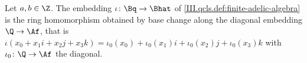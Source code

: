 Let $a,b\in\Z$. The embedding $\iota\colon\Bq\to\Bhat$ of \cref{III.qcls.def:finite-adelic-algebra} is the ring homomorphism obtained by base change along the diagonal
embedding $\Q\to\Af$, that is $\iota(x_0+x_1i+x_2j+x_3k)=\iota_0(x_0)+\iota_0(x_1)i+\iota_0(x_2)j+\iota_0(x_3)k$ with $\iota_0\colon\Q\to\Af$ the diagonal.
